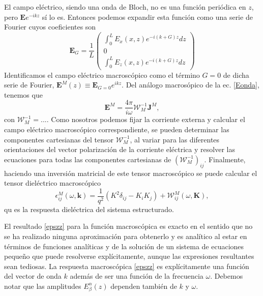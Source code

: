 \documentclass{iopart}
\begin{document}
El campo eléctrico, siendo una onda de Bloch, no es una función
periódica en $z$, pero $\mathbf{E} e^{-ikz}$ sí lo es. Entonces podemos
expandir esta función como una serie de Fourier
\cite{spiegel1974fourier} cuyos coeficientes son
\begin{equation}  \label{EG1}
\mathbf{E} _{ G}=\frac{1}{L} \left(
\begin{array}{c}
\int_{0}^{L}  E_x (x,z)e^{-i(k + G)z}dz\\
0\\
\int_{0}^{L}  E_z (x,z)e^{-i(k + G)z}dz
\end{array}\right)
\end{equation}
Identificamos el campo eléctrico macroscópico como el término $G=0$ de
dicha serie de Fourier, $\mathbf{E}^M(z)\equiv \mathbf{E} _{G=0}
e^{ikz}$. Del análogo macrosópico de la ec. \ref{Eonda}, tenemos que
\begin{equation}\label{EMacro1d}
 \mathbf{E}^M = \frac{4 \pi}{i\omega} {\mathcal
   W}^{-1}_{M}\mathbf{J}^M,
\end{equation}
con ${\mathcal W}^{-1}_{M}=...$. Como nosotros podemos fijar la
corriente externa y calcular el campo eléctrico macroscópico
correspondiente, se pueden determinar las componentes cartesianas del
tensor ${\mathcal W}^{-1}_{M}$, al variar para las diferentes
orientaciones del vector polarización de la corriente eléctrica y
resolver las ecuaciones para todas las componentes cartesianas de
${({\mathcal W}^{-1}_{M})}_{ij}$. Finalmente, haciendo una inversión
matricial de este tensor macroscópico se puede calcular el tensor
dieléctrico macroscópico
\begin{equation}
  \label{EpsMacroTensor}
  \epsilon^M_{ij}(\omega,\mathbf k)=
  \frac{1}{q^2}(K^2\delta_{ij}- K_i  K_j)+\mathcal W^M_{ij}(\omega,
  \mathbf K),
\end{equation}
qu es la respuesta dieléctrica del sistema estructurado.


El resultado \ref{epszz} para la función macroscópica es exacto en
el sentido que no se ha realizado ninguna aproximación para obtenerlo
y es analítico al estar en términos de funciones analíticas y de la
solución de un sistema de ecuaciones pequeño que puede resolverse
explícitamente, aunque las expresiones resultantes sean tediosas.  La
respuesta macroscópica \ref{epszz} es explícitamente una función del
vector de onda $k$ además de ser una función de la frecuencia
$\omega$. Debemos notar que las amplitudes $E^{\alpha}_{\beta}(z)$
dependen también de $k$ y $\omega$.
\end{document}
